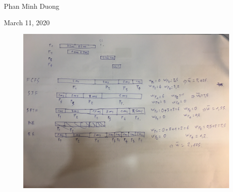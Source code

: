 \documentclass[article, paper=a4, fontsize=11pt]{scrartcl}
\begin{document}
\begin{center}
Phan Minh Duong
\end{center}
\begin{center}
March 11, 2020
\end{center}

\begin{figure}[h!]
 \centering
  \includegraphics[width=\linewidth]{process.JPG}
  \label{fig:boat1}
 
\end{figure}
\end{document}
